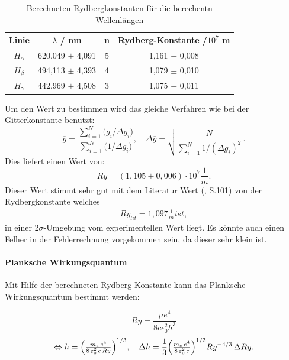 \begin{table}[htbp]
    \centering
    \begin{tabular}{|c|c|c|c|}
        Linie & $\lambda$ / nm & n & Rydberg-Konstante /$10^7$ m \\
        \hline
        $H_\alpha$ & 620,049 $\pm$ 4,091 & 5 & 1,161 $\pm$ 0,008 \\
        $H_\beta$ & 494,113 $\pm$ 4,393 & 4 & 1,079 $\pm$ 0,010  \\
        $H_\gamma$ & 442,969 $\pm$ 4,508 & 3 & 1,075 $\pm$ 0,011 \\
    \end{tabular}
    \caption{Berechneten Rydbergkonstanten für die berechentn Wellenlängen}
    \label{tab:Rydberg}
\end{table}

Um den Wert zu bestimmen wird das gleiche Verfahren wie bei der Gitterkonstante benutzt:
\begin{equation}
  \overline{g}
  = \frac{\sum_{i=1}^{N} \bigl(g_i/\Delta g_i\bigr)}
         {\sum_{i=1}^{N} \bigl(1/\Delta g_i\bigr)},
  \quad
  \Delta\overline{g}
  = \sqrt{\frac{N}{\sum_{i=1}^{N} 1/(\Delta g_i)^{2}}}\,.
\end{equation}
Dies liefert einen Wert von:
\begin{equation}
    Ry = (1,105 \pm 0,006)\cdot 10^7 \frac{1}{m}.
\end{equation}
Dieser Wert stimmt sehr gut mit dem Literatur Wert (\cite{Demtröder_Ex3}, S.101) von der Rydbergkonstante welches 
\begin{align}
    Ry_{lit} = 1,097 \frac{1}{m} ist,
\end{align}
in einer $2\sigma$-Umgebung vom experimentellen Wert liegt.
Es könnte auch einen Felher in der Fehlerrechnung vorgekommen sein, da dieser sehr klein ist.

\paragraph{Planksche Wirkungsquantum}

Mit Hilfe der berechneten Rydberg-Konstante kann das Planksche-Wirkungsquantum bestimmt werden:

\begin{equation}
    Ry = \frac{\mu e^4}{8 c \epsilon_0^2h^3}
\end{equation}
\begin{equation}
  \Leftrightarrow h
  = \Bigl(\tfrac{m_e\,e^{4}}{8\,\varepsilon_{0}^{2}\,c\,Ry}\Bigr)^{1/3},
  \quad
  \Delta h
  = \frac{1}{3}
    \Bigl(\tfrac{m_e\,e^{4}}{8\,\varepsilon_{0}^{2}\,c}\Bigr)^{1/3}
    Ry^{-4/3}\,\Delta Ry.
\end{equation}

